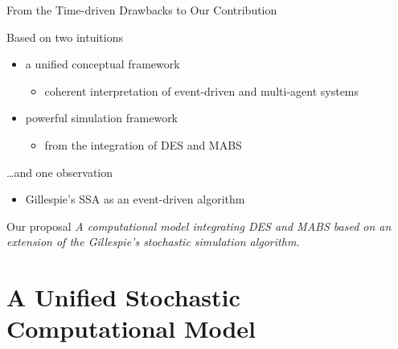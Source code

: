 \documentclass[presentation]{beamer} %
\begin{document}
\begin{frame}{From the Time-driven Drawbacks to Our Contribution}

Based on two intuitions

\begin{itemize}
      \item  a unified conceptual framework \cite{agentevent-cscwd2015}
       \begin{itemize}
 	     	\item  coherent interpretation of event-driven and multi-agent systems 
	\end{itemize}
 	\item powerful simulation framework \cite{meyer-mabs2014}
	\begin{itemize}
      		\item from the integration of DES and MABS 
	\end{itemize}
\end{itemize}

\ldots and one observation
 
 \begin{itemize}
      \item  Gillespie's SSA  \cite{gillespie1977} as an event-driven algorithm
\end{itemize}

\begin{block}{Our proposal}
\emph{A computational model integrating DES and MABS based on an extension of the Gillespie's stochastic simulation algorithm.}
  \end{block}
  
\end{frame}

\section{A Unified Stochastic Computational Model}
\end{document}
